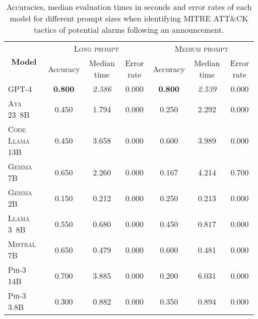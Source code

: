 \begin{table*}
    \caption{Accuracies, median evaluation times in seconds and error rates of each model for different prompt sizes
    when identifying MITRE ATT\&CK tactics of potential alarms following an announcement.}
    \label{tab:tactic-detection}
    \begin{tabular}{lcccccc}
        \toprule
        \multicolumn{1}{c}{\multirow{2}{*}{\textbf{Model}}} & \multicolumn{3}{c}{\textsc{Long prompt}} & \multicolumn{3}{c}{\textsc{Medium prompt}} \\
        \cmidrule(lr){2-4} \cmidrule(lr){5-7}
        & Accuracy       & Median time    & Error rate & Accuracy       & Median time    & Error rate \\
        \midrule
        \textsc{GPT-4}          & \textbf{0.800} & \textit{2.586} & 0.000      & \textbf{0.800} & \textit{2.539}       & 0.000      \\
        \textsc{Aya 23\ 8B}     & 0.450          & 1.794          & 0.000      & 0.250          & 2.292          & 0.000      \\
        \textsc{Code Llama 13B} & 0.450          & 3.658          & 0.000      & 0.600          & 3.989          & 0.000      \\
        \textsc{Gemma 7B}       & 0.650          & 2.260          & 0.000      & 0.167          & 4.214          & 0.700      \\
        \textsc{Gemma 2B}       & 0.150          & 0.212          & 0.000      & 0.250          & 0.213          & 0.000      \\
        \textsc{Llama 3\ 8B}    & 0.550          & 0.680          & 0.000      & 0.450          & 0.817          & 0.000      \\
        \textsc{Mistral 7B}     & 0.650          & 0.479          & 0.000      & 0.600          & 0.481          & 0.000      \\
        \textsc{Phi-3 14B}      & 0.700          & 3.885          & 0.000      & 0.200          & 6.031          & 0.000      \\
        \textsc{Phi-3 3.8B}     & 0.300          & 0.882          & 0.000      & 0.350          & 0.894          & 0.000      \\
        \bottomrule
    \end{tabular}
\end{table*}